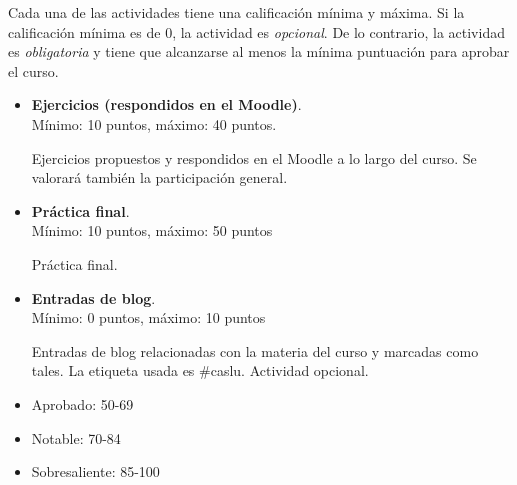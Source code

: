 \documentclass[a4paper]{article}
\begin{document}
Cada una de las actividades tiene una calificación mínima y máxima. Si la calificación mínima es de 0, la actividad es \textit{opcional}. De lo contrario, la actividad es 
\textit{obligatoria} y tiene que alcanzarse al menos la mínima puntuación para aprobar el curso.

\begin{itemize}
\item \textbf{Ejercicios (respondidos en el Moodle)}. \\
  Mínimo: 10 puntos, máximo: 40 puntos.

  Ejercicios propuestos y respondidos en el Moodle a lo largo del curso. Se valorará también la participación general.

\item \textbf{Práctica final}. \\
  Mínimo: 10 puntos, máximo: 50 puntos

  Práctica final. 

\item \textbf{Entradas de blog}. \\
  Mínimo: 0 puntos, máximo: 10 puntos

  Entradas de blog relacionadas con la materia del curso y marcadas como tales. La etiqueta usada es \#caslu. Actividad opcional. 
\end{itemize} 

\begin{itemize}
\item Aprobado: 50-69
\item Notable: 70-84
\item Sobresaliente: 85-100
\end{itemize}

\end{document}
